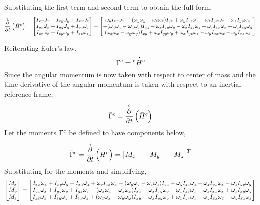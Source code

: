 \documentclass[class=report, 12pt, crop=false]{standalone}
\begin{document}
\begin{center}
Substituting the first term and second term to obtain the full form,
$$\overset{i}{\frac{\partial}{\partial t}}\left(\bar{H}^c\right) = 
\begin{bmatrix} 
I_{xx}\dot{\omega_x} + I_{xy}\dot{\omega_y} + I_{xz}\dot{\omega_z} \\
I_{yx}\dot{\omega_x} + I_{yy}\dot{\omega_y} + I_{yz}\dot{\omega_z} \\
I_{zx}\dot{\omega_x} + I_{zy}\dot{\omega_y} + I_{zz}\dot{\omega_z}
\end{bmatrix} + \begin{bmatrix}
\omega_yI_{zx}\omega_x + (\omega_y\omega_y - \omega_z\omega_z)I_{yz} + \omega_yI_{zz}\omega_z - \omega_zI_{yx}\omega_x - \omega_zI_{yy}\omega_y \\
-(\omega_x\omega_x - \omega_z\omega_z)I_{xz} - \omega_xI_{zy}\omega_y - \omega_xI_{zz}\omega_z + \omega_zI_{xx}\omega_x + \omega_zI_{xy}\omega_y \\
(\omega_x\omega_x - \omega_y\omega_y)I_{xy} + \omega_xI_{yy}\omega_y + \omega_xI_{yz}\omega_z - \omega_yI_{xx}\omega_x  - \omega_yI_{xz}\omega_z
\end{bmatrix}$$

Reiterating Euler's law,
$$\bar{\Gamma}^{c} = {}^{e}\dot{\bar{H}}^{c}$$
Since the angular momentum is now taken with respect to center of mass and the time derivative of the angular momentum is taken with respect to an inertial reference frame,
$$\bar{\Gamma}^{c} = \overset{i}{\frac{\partial}{\partial t}}\left(\bar{H}^c\right)$$
Let the moments $\bar{\Gamma}^{c}$ be defined to have components below,
$$\bar{\Gamma}^{c} = \overset{i}{\frac{\partial}{\partial t}}\left(\bar{H}^c\right) = \begin{bmatrix}M_x && M_y && M_z\end{bmatrix}^T$$
Substituting for the moments and simplifying,
$$\begin{bmatrix}M_x \\ M_y \\ M_z\end{bmatrix} = 
\begin{bmatrix} 
I_{xx}\dot{\omega_x} + I_{xy}\dot{\omega_y} + I_{xz}\dot{\omega_z}  + \omega_yI_{zx}\omega_x + (\omega_y\omega_y - \omega_z\omega_z)I_{yz} + \omega_yI_{zz}\omega_z - \omega_zI_{yx}\omega_x - \omega_zI_{yy}\omega_y\\
I_{yx}\dot{\omega_x} + I_{yy}\dot{\omega_y} + I_{yz}\dot{\omega_z} - (\omega_x\omega_x - \omega_z\omega_z)I_{xz} - \omega_xI_{zy}\omega_y - \omega_xI_{zz}\omega_z + \omega_zI_{xx}\omega_x + \omega_zI_{xy}\omega_y\\
I_{zx}\dot{\omega_x} + I_{zy}\dot{\omega_y} + I_{zz}\dot{\omega_z} + (\omega_x\omega_x - \omega_y\omega_y)I_{xy} + \omega_xI_{yy}\omega_y + \omega_xI_{yz}\omega_z - \omega_yI_{xx}\omega_x  - \omega_yI_{xz}\omega_z
\end{bmatrix}$$


\end{center}
\end{document}
